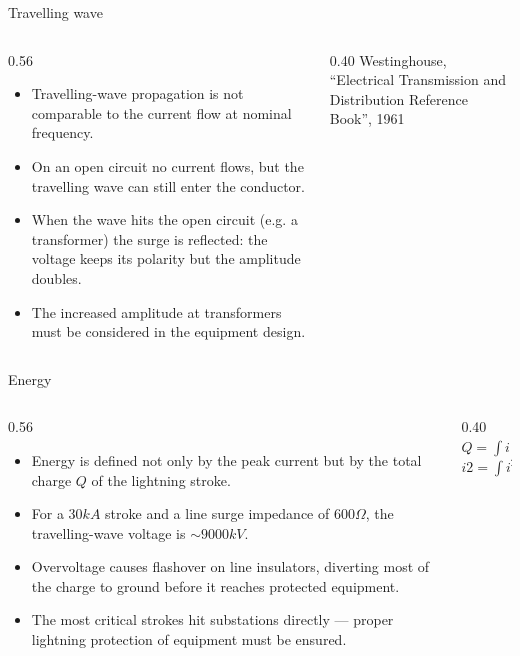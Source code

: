 \begin{frame}{Travelling wave}
  \begin{columns}[c,onlytextwidth]
    \begin{column}{0.56\textwidth}
      \begin{itemize}
        \setlength{\itemsep}{0.4em}
        \item Travelling-wave propagation is not comparable to the current
              flow at nominal frequency.
        \item On an open circuit no current flows, but the travelling wave
              can still enter the conductor.
        \item When the wave hits the open circuit (e.g. a transformer) the
              surge is reflected: the voltage keeps its polarity but the
              amplitude doubles.
        \item The increased amplitude at transformers must be considered in
              the equipment design.
      \end{itemize}
      \vspace{0.2em}
    \end{column}
    \begin{column}{0.40\textwidth}
      \centering
      {\color{atGray}\footnotesize Westinghouse, ``Electrical Transmission and Distribution Reference Book'', 1961}
    \end{column}
  \end{columns}
\end{frame}

\begin{frame}{Energy}
  \begin{columns}[c,onlytextwidth]
    \begin{column}{0.56\textwidth}
      \begin{itemize}
        \setlength{\itemsep}{0.35em}
        \item Energy is defined not only by the peak current but by the total
              charge $Q$ of the lightning stroke.
        \item For a $30 kA$ stroke and a line surge impedance of $600 \Omega$,
              the travelling-wave voltage is $\sim9000kV$.
        \item Overvoltage causes flashover on line insulators, diverting most
              of the charge to ground before it reaches protected equipment.
        \item The most critical strokes hit substations directly --- proper
              lightning protection of equipment must be ensured.
      \end{itemize}
    \end{column}
    \begin{column}{0.40\textwidth}
      \centering
      $Q=\int i\,dt$\\
      $i2=\int i^2\,dt$
    \end{column}
  \end{columns}
\end{frame}


